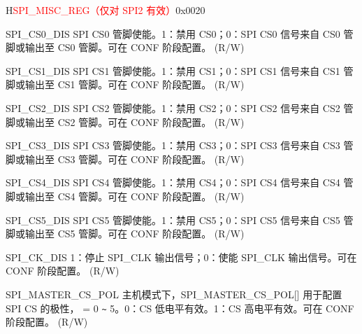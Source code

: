 \begin{register}{H}{\textcolor{red}{SPI\_MISC\_REG（仅对 SPI2 有效）}}{0x{}0020}\label{regdesc:SPIMISCREG}
%
%
%
%
%
%
%
%
%
%
%
%
%
%
%
%
%
%
%
%
\regnewline%
\begin{regdesc}\begin{reglist}
\label{fielddesc:SPICS0DIS}\item [SPI\_CS0\_DIS] SPI CS0 管脚使能。1：禁用 CS0；0：SPI CS0 信号来自 CS0 管脚或输出至 CS0 管脚。可在 CONF 阶段配置。 (R/W)
\label{fielddesc:SPICS1DIS}\item [SPI\_CS1\_DIS] SPI CS1 管脚使能。1：禁用 CS1；0：SPI CS1 信号来自 CS1 管脚或输出至 CS1 管脚。可在 CONF 阶段配置。 (R/W)
\label{fielddesc:SPICS2DIS}\item [SPI\_CS2\_DIS] SPI CS2 管脚使能。1：禁用 CS2；0：SPI CS2 信号来自 CS2 管脚或输出至 CS2 管脚。可在 CONF 阶段配置。 (R/W)
\label{fielddesc:SPICS3DIS}\item [SPI\_CS3\_DIS] SPI CS3 管脚使能。1：禁用 CS3；0：SPI CS3 信号来自 CS3 管脚或输出至 CS3 管脚。可在 CONF 阶段配置。 (R/W)
\label{fielddesc:SPICS4DIS}\item [SPI\_CS4\_DIS] SPI CS4 管脚使能。1：禁用 CS4；0：SPI CS4 信号来自 CS4 管脚或输出至 CS4 管脚。可在 CONF 阶段配置。 (R/W)
\label{fielddesc:SPICS5DIS}\item [SPI\_CS5\_DIS] SPI CS5 管脚使能。1：禁用 CS5；0：SPI CS5 信号来自 CS5 管脚或输出至 CS5 管脚。可在 CONF 阶段配置。 (R/W)
\label{fielddesc:SPICKDIS}\item [SPI\_CK\_DIS] 1：停止 SPI\_CLK 输出信号；0：使能 SPI\_CLK 输出信号。可在 CONF 阶段配置。 (R/W)
\label{fielddesc:SPIMASTERCSPOL}\item [SPI\_MASTER\_CS\_POL] 主机模式下，SPI\_MASTER\_CS\_POL[] 用于配置 SPI CS 的极性， = 0 \verb+~+ 5。0：CS 低电平有效。1：CS 高电平有效。可在 CONF 阶段配置。 (R/W) 

\end{reglist}
\end{regdesc}
\end{register}
